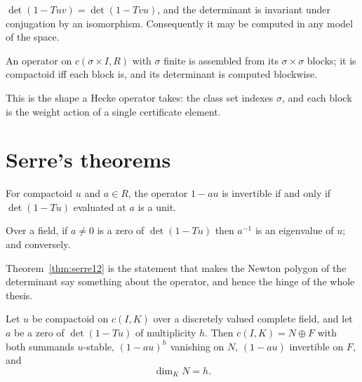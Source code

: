 \begin{theorem}[Invariances]
  \label{thm:charpowerseries-inv}
  \leanok
  $\det(1 - Tuv) = \det(1 - Tvu)$, and the determinant is invariant under conjugation by an
  isomorphism.  Consequently it may be computed in any model of the space.
\end{theorem}

\begin{proposition}
  \label{prop:blockop}
  \leanok
  An operator on $c(\sigma \times I, R)$ with $\sigma$ finite is assembled from its $\sigma
  \times \sigma$ blocks; it is compactoid iff each block is, and its determinant is computed
  blockwise.
\end{proposition}

This is the shape a Hecke operator takes: the class set indexes $\sigma$, and each block is the
weight action of a single certificate element.

\section{Serre's theorems}

\begin{theorem}
  \label{thm:serre11}
  \leanok
  For compactoid $u$ and $a \in R$, the operator $1 - a u$ is invertible if and only if
  $\det(1-Tu)$ evaluated at $a$ is a unit.
\end{theorem}

\begin{theorem}
  \label{thm:serre12}
  \leanok
  Over a field, if $a \neq 0$ is a zero of $\det(1 - Tu)$ then $a^{-1}$ is an eigenvalue of $u$;
  and conversely.
\end{theorem}

Theorem~\ref{thm:serre12} is the statement that makes the Newton polygon of the determinant say
something about the operator, and hence the hinge of the whole thesis.

\begin{theorem}
  \label{thm:riesz}
  \leanok
  Let $u$ be compactoid on $c(I,K)$ over a discretely valued complete field, and let $a$ be a
  zero of $\det(1 - Tu)$ of multiplicity $h$.  Then $c(I,K) = N \oplus F$ with both summands
  $u$-stable, $(1 - au)^h$ vanishing on $N$, $(1-au)$ invertible on $F$, and
  \[
    \dim_K N = h .
  \]
\end{theorem}

